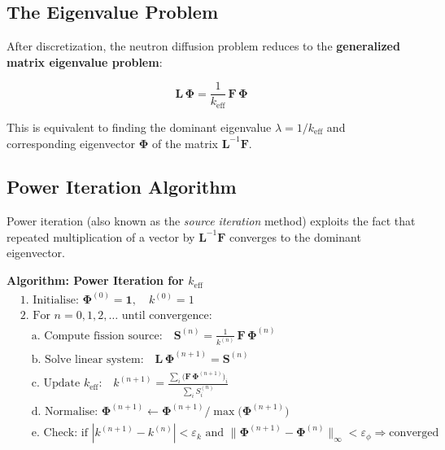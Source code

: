 \documentclass[12pt,a4paper]{article}
\newcommand{\keff}{k_{\mathrm{eff}}}
\begin{document}
\subsection{The Eigenvalue Problem}

After discretization, the neutron diffusion problem reduces to the
\textbf{generalized matrix eigenvalue problem}:

\begin{equation}
  \mathbf{L}\,\bm{\Phi} = \frac{1}{\keff}\,\mathbf{F}\,\bm{\Phi}
\end{equation}

This is equivalent to finding the dominant eigenvalue $\lambda = 1/\keff$
and corresponding eigenvector $\bm{\Phi}$ of the matrix $\mathbf{L}^{-1}\mathbf{F}$.

\subsection{Power Iteration Algorithm}

Power iteration (also known as the \textit{source iteration} method)
exploits the fact that repeated multiplication of a vector by
$\mathbf{L}^{-1}\mathbf{F}$ converges to the dominant eigenvector.

\begin{eqbox}
\textbf{Algorithm: Power Iteration for $\keff$}
\begin{align*}
  &\text{1. Initialise: } \bm{\Phi}^{(0)} = \mathbf{1}, \quad k^{(0)} = 1 \\[4pt]
  &\text{2. For } n = 0, 1, 2, \ldots \text{ until convergence:} \\
  &\quad\text{a. Compute fission source:} \quad
     \mathbf{S}^{(n)} = \frac{1}{k^{(n)}}\,\mathbf{F}\,\bm{\Phi}^{(n)} \\[4pt]
  &\quad\text{b. Solve linear system:} \quad
     \mathbf{L}\,\bm{\Phi}^{(n+1)} = \mathbf{S}^{(n)} \\[4pt]
  &\quad\text{c. Update } \keff\text{:} \quad
     k^{(n+1)} = \frac{\displaystyle\sum_{i}\bigl(\mathbf{F}\,\bm{\Phi}^{(n+1)}\bigr)_i}
                      {\displaystyle\sum_{i} S^{(n)}_i} \\[4pt]
  &\quad\text{d. Normalise: } \bm{\Phi}^{(n+1)}
     \leftarrow \bm{\Phi}^{(n+1)} / \max\!\bigl(\bm{\Phi}^{(n+1)}\bigr) \\[4pt]
  &\quad\text{e. Check: if } |k^{(n+1)} - k^{(n)}| < \varepsilon_k
     \text{ and } \|\bm{\Phi}^{(n+1)} - \bm{\Phi}^{(n)}\|_\infty < \varepsilon_\phi
     \Rightarrow \text{converged}
\end{align*}
\end{eqbox}
\end{document}
